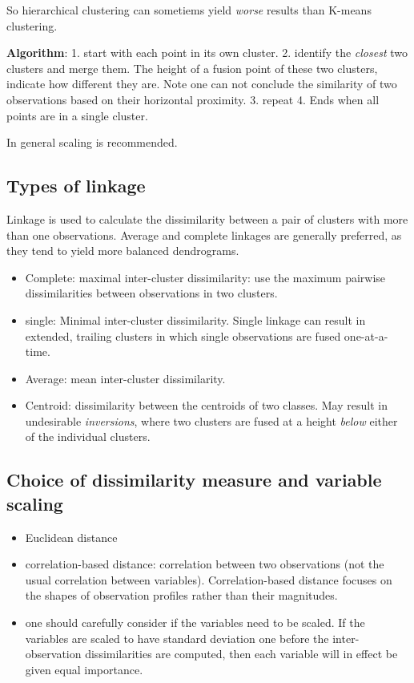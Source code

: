 \documentclass[
  letterpaper,
  DIV=11,
  numbers=noendperiod]{scrreprt}
\providecommand{\tightlist}{%
  \setlength{\itemsep}{0pt}\setlength{\parskip}{0pt}}\usepackage{longtable,booktabs,array}
\begin{document}
So hierarchical clustering can sometiems yield \emph{worse} results than
K-means clustering.

\textbf{Algorithm}: 1. start with each point in its own cluster. 2.
identify the \emph{closest} two clusters and merge them. The height of a
fusion point of these two clusters, indicate how different they are.
Note one can not conclude the similarity of two observations based on
their horizontal proximity. 3. repeat 4. Ends when all points are in a
single cluster.

In general scaling is recommended.

\subsection{Types of linkage}\label{types-of-linkage}

Linkage is used to calculate the dissimilarity between a pair of
clusters with more than one observations. Average and complete linkages
are generally preferred, as they tend to yield more balanced
dendrograms.

\begin{itemize}
\tightlist
\item
  Complete: maximal inter-cluster dissimilarity: use the maximum
  pairwise dissimilarities between observations in two clusters.
\item
  single: Minimal inter-cluster dissimilarity. Single linkage can result
  in extended, trailing clusters in which single observations are fused
  one-at-a-time.
\item
  Average: mean inter-cluster dissimilarity.
\item
  Centroid: dissimilarity between the centroids of two classes. May
  result in undesirable \emph{inversions}, where two clusters are fused
  at a height \emph{below} either of the individual clusters.
\end{itemize}

\subsection{Choice of dissimilarity measure and variable
scaling}\label{choice-of-dissimilarity-measure-and-variable-scaling}

\begin{itemize}
\tightlist
\item
  Euclidean distance
\item
  correlation-based distance: correlation between two observations (not
  the usual correlation between variables). Correlation-based distance
  focuses on the shapes of observation profiles rather than their
  magnitudes.
\item
  one should carefully consider if the variables need to be scaled. If
  the variables are scaled to have standard deviation one before the
  inter-observation dissimilarities are computed, then each variable
  will in effect be given equal importance.
\end{itemize}
\end{document}
